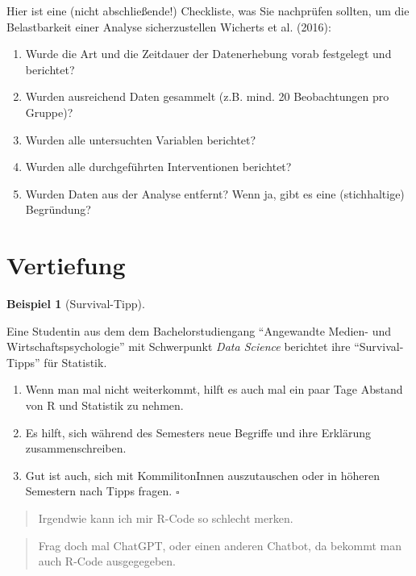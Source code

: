 \documentclass[
  letterpaper,
]{scrbook}
\providecommand{\tightlist}{%
  \setlength{\itemsep}{0pt}\setlength{\parskip}{0pt}}\usepackage{longtable,booktabs,array}
\theoremstyle{definition}
\theoremstyle{definition}
\newtheorem{example}{Beispiel}[chapter]
\theoremstyle{definition}
\theoremstyle{remark}
\begin{document}
Hier ist eine (nicht abschließende!) Checkliste, was Sie nachprüfen
sollten, um die Belastbarkeit einer Analyse sicherzustellen Wicherts et
al. (2016):

\begin{enumerate}
\def\labelenumi{\arabic{enumi}.}
\tightlist
\item
  Wurde die Art und die Zeitdauer der Datenerhebung vorab festgelegt und
  berichtet?
\item
  Wurden ausreichend Daten gesammelt (z.B. mind. 20 Beobachtungen pro
  Gruppe)?
\item
  Wurden alle untersuchten Variablen berichtet?
\item
  Wurden alle durchgeführten Interventionen berichtet?
\item
  Wurden Daten aus der Analyse entfernt? Wenn ja, gibt es eine
  (stichhaltige) Begründung?
\end{enumerate}

\section{Vertiefung}\label{vertiefung-5}

\begin{example}[Survival-Tipp]\protect\hypertarget{exm-survival1}{}\label{exm-survival1}

Eine Studentin aus dem dem Bachelorstudiengang \enquote{Angewandte
Medien- und Wirtschaftspsychologie} mit Schwerpunkt \emph{Data Science}
berichtet ihre \enquote{Survival-Tipps} für Statistik.

\begin{enumerate}
\def\labelenumi{\arabic{enumi}.}
\tightlist
\item
  Wenn man mal nicht weiterkommt, hilft es auch mal ein paar Tage
  Abstand von R und Statistik zu nehmen.
\item
  Es hilft, sich während des Semesters neue Begriffe und ihre Erklärung
  zusammenschreiben.
\item
  Gut ist auch, sich mit KommilitonInnen auszutauschen oder in höheren
  Semestern nach Tipps fragen. \(\square\)
\end{enumerate}

\end{example}

\begin{quote}
{} Irgendwie kann ich mir R-Code so schlecht merken.
\end{quote}

\begin{quote}
{} Frag doch mal ChatGPT, oder einen anderen Chatbot, da
bekommt man auch R-Code ausgegegeben.
\end{quote}
\end{document}
